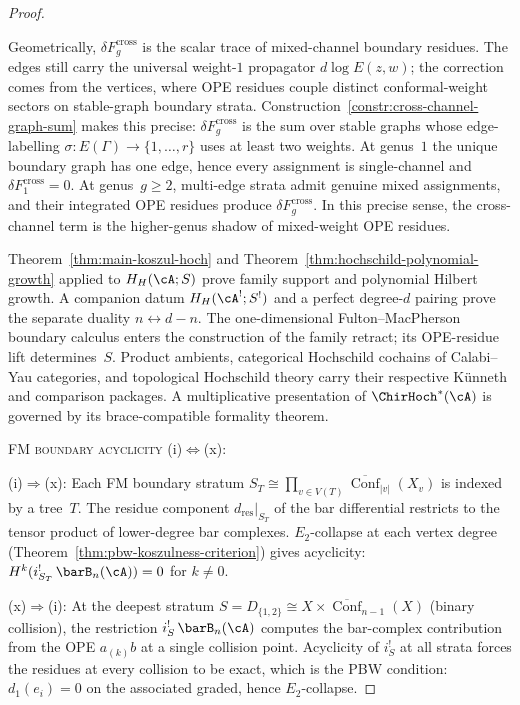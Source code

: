 \begin{proof}
\begin{remark}
Geometrically, $\delta F_g^{\mathrm{cross}}$ is the scalar trace of
mixed-channel boundary residues. The edges still carry the universal
weight-$1$ propagator $d\log E(z,w)$; the correction comes from the
vertices, where OPE residues couple distinct conformal-weight
sectors on stable-graph boundary strata. Construction~\ref{constr:cross-channel-graph-sum}
makes this precise: $\delta F_g^{\mathrm{cross}}$ is the sum over
stable graphs whose edge-labelling
$\sigma\colon E(\Gamma)\to\{1,\ldots,r\}$ uses at least two
weights. At genus~$1$ the unique boundary graph has one edge,
hence every assignment is single-channel and
$\delta F_1^{\mathrm{cross}}=0$. At genus~$g \geq 2$,
multi-edge strata admit genuine mixed assignments, and their
integrated OPE residues produce
$\delta F_g^{\mathrm{cross}}$. In this precise sense, the
cross-channel term is the higher-genus shadow of mixed-weight OPE
residues.
\end{remark}

\begin{remark}
Theorem~\ref{thm:main-koszul-hoch} and
Theorem~\ref{thm:hochschild-polynomial-growth} applied to
$H_H(\cA;S)$ prove family support and polynomial Hilbert growth.  A
companion datum $H_H(\cA^!;S^!)$ and a perfect degree-$d$ pairing
prove the separate duality
$n\leftrightarrow d-n$.  The one-dimensional Fulton--MacPherson
boundary calculus enters the construction of the family retract; its
OPE-residue lift determines~$S$.  Product ambients, categorical
Hochschild cochains of Calabi--Yau categories, and topological
Hochschild theory carry their respective K\"unneth and comparison
packages.  A multiplicative presentation of $\ChirHoch^*(\cA)$ is
governed by its brace-compatible formality theorem.
\end{remark}

\medskip
\textsc{FM boundary acyclicity}
\textup{(i)}$\Leftrightarrow$\textup{(x)}:

\smallskip\noindent
\textup{(i)}$\Rightarrow$\textup{(x)}:
Each FM boundary stratum $S_T \cong \prod_{v \in V(T)}
\overline{\operatorname{Conf}}_{|v|}(X_v)$ is indexed by a tree~$T$.
The residue component $d_{\mathrm{res}}|_{S_T}$ of the bar
differential restricts to the tensor product of lower-degree bar
complexes. $E_2$-collapse at each vertex degree
(Theorem~\ref{thm:pbw-koszulness-criterion}) gives acyclicity:
$H^k(i_{S_T}^!\,\barB_n(\cA)) = 0$ for $k \neq 0$.

\smallskip\noindent
\textup{(x)}$\Rightarrow$\textup{(i)}:
At the deepest stratum $S = D_{\{1,2\}} \cong X \times
\overline{\operatorname{Conf}}_{n-1}(X)$ (binary collision), the
restriction $i_S^!\,\barB_n(\cA)$ computes the bar-complex
contribution from the OPE $a_{(k)}b$ at a single collision point.
Acyclicity of $i_S^!$ at all strata forces the residues at every
collision to be exact, which is the PBW condition:
$d_1(e_i) = 0$ on the associated graded, hence $E_2$-collapse.


\end{proof}

